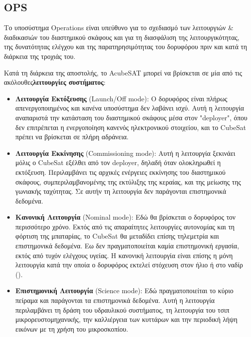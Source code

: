 \documentclass[a4paper,nobib]{tufte-book}
\begin{document}
\subsection{\acf{OPS}}

Το υποσύστημα Operations είναι υπεύθυνο για το σχεδιασμό των λειτουργιών \& διαδικασιών του διαστημικού σκάφους και για τη διασφάλιση της λειτουργικότητας, της δυνατότητας ελέγχου και της παρατηρησιμότητας του δορυφόρου πριν και κατά τη διάρκεια της τροχιάς του.

Κατά τη διάρκεια της αποστολής, το AcubeSAT μπορεί να βρίσκεται σε μία από τις ακόλουθες\textbf{λειτουργίες συστήματος}:\autocite{MDO}
\begin{itemize}
	\item \textbf{Λειτουργία Εκτόξευσης} (Launch/Off mode): Ο δορυφόρος είναι πλήρως απενεργοποιημένος και κανένα υποσύστημα δεν λαβάνει ισχύ. Αυτή η λειτουργία αναπαριστά την κατάσταση του διαστημικού σκάφους μέσα στον "deployer", όπου δεν επιτρέπεται η ενεργοποίηση κανενός ηλεκτρονικού στοιχείου,\autocite[req. 3.3.3]{CDS13} και το CubeSat πρέπει να βρίσκεται σε πλήρη αδράνεια.
	
	\item \textbf{Λειτουργία Εκκίνησης} (Commissioning mode): Αυτή η λειτουργία ξεκινάει μόλις ο CubeSat εξέλθει από τον deployer, δηλαδή όταν ολοκληρωθεί η εκτόξευση. Περιλαμβάνει τις αρχικές ενέργειες εκκίνησης του διαστημικού σκάφους, συμπεριλαμβανομένης της εκτύλιξης της κεραίας, και της μείωσης της γωνιακής ταχύτητας. Σε αυτήν τη λειτουργία δεν παράγονται επιστημονικά δεδομένα.
	
	\item \textbf{Κανονική Λειτουργία} (Nominal mode): Εδώ θα βρίσκεται ο δορυφόρος τον περισσότερο χρόνο. Εκτός από τις απαραίτητες λειτουργίες αυτονομίας και τη φόρτιση της μπαταρίας, το CubeSat θα μεταδίδει επίσης τηλεμετρία και επιστημονικά δεδομένα. Εω δεν πραγματοποιείται καμία επιστημονική εργασία, εκτός από τυχόν ελέγχους υγείας. Η κανονική λειτουργία είναι επίσης η μόνη λειτουργία κατά την οποία ο δορυφόρος εκτελεί στόχευση στον ήλιο ή στο ναδίρ ().
	
	\item \textbf{Επιστημονική Λειτουργία} (Science mode): Εδώ πραγματοποιείται το κύριο πείραμα και παράγονται τα επιστημονικά δεδομένα. Αυτή η λειτουργία περιλαμβάνει τη δράση του υδραυλικού συστήματος, τη λειτουργία του τσιπ μικρορευστομηχανικής, την καλλιέργεια των κυττάρων και την περιοδική λήψη εικόνων με τη χρήση του μικροσκοπίου.
	

\end{itemize}
\end{document}
